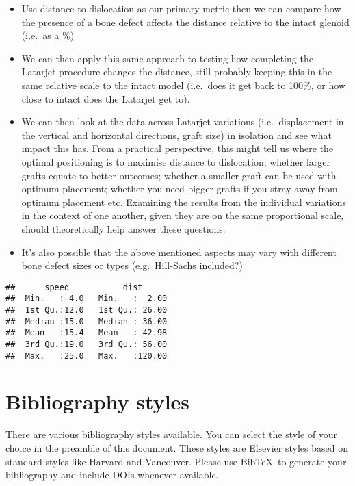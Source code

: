 \documentclass[]{elsarticle} %
\providecommand{\tightlist}{%
  \setlength{\itemsep}{0pt}\setlength{\parskip}{0pt}}
\begin{document}
\begin{itemize}
\tightlist
\item
  Use distance to dislocation as our primary metric then we can compare
  how the presence of a bone defect affects the distance relative to the
  intact glenoid (i.e.~as a \%)
\item
  We can then apply this same approach to testing how completing the
  Latarjet procedure changes the distance, still probably keeping this
  in the same relative scale to the intact model (i.e.~does it get back
  to 100\%, or how close to intact does the Latarjet get to).
\item
  We can then look at the data across Latarjet variations
  (i.e.~displacement in the vertical and horizontal directions, graft
  size) in isolation and see what impact this has. From a practical
  perspective, this might tell us where the optimal positioning is to
  maximise distance to dislocation; whether larger grafts equate to
  better outcomes; whether a smaller graft can be used with optimum
  placement; whether you need bigger grafts if you stray away from
  optimum placement etc. Examining the results from the individual
  variations in the context of one another, given they are on the same
  proportional scale, should theoretically help answer these questions.
\item
  It's also possible that the above mentioned aspects may vary with
  different bone defect sizes or types (e.g.~Hill-Sachs included?)
\end{itemize}

\begin{verbatim}
##      speed           dist       
##  Min.   : 4.0   Min.   :  2.00  
##  1st Qu.:12.0   1st Qu.: 26.00  
##  Median :15.0   Median : 36.00  
##  Mean   :15.4   Mean   : 42.98  
##  3rd Qu.:19.0   3rd Qu.: 56.00  
##  Max.   :25.0   Max.   :120.00
\end{verbatim}

\hypertarget{bibliography-styles}{%
\section{Bibliography styles}\label{bibliography-styles}}

There are various bibliography styles available. You can select the
style of your choice in the preamble of this document. These styles are
Elsevier styles based on standard styles like Harvard and Vancouver.
Please use BibTeX~to generate your bibliography and include DOIs
whenever available.
\end{document}
